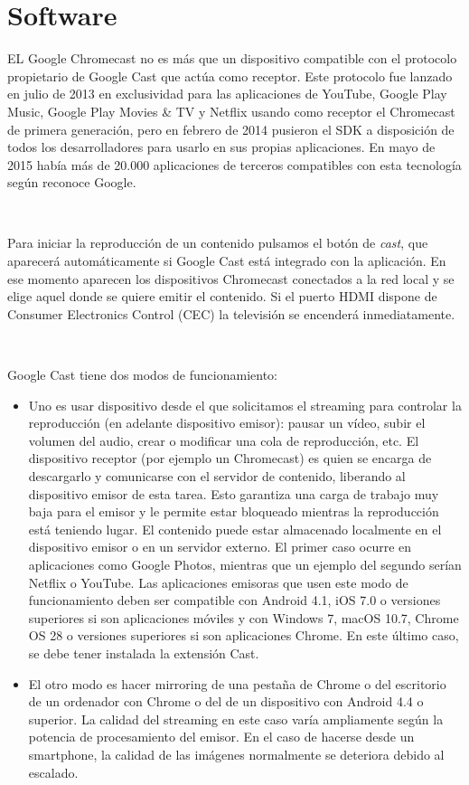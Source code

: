 \section{Software}

EL Google Chromecast no es más que un dispositivo compatible con el protocolo propietario de Google Cast que actúa como receptor.
Este protocolo fue lanzado en julio de 2013 en exclusividad para las aplicaciones de YouTube, Google Play Music, Google Play Movies \& TV y Netflix usando como receptor el Chromecast de primera generación, pero en febrero de 2014 pusieron el SDK a disposición de todos los desarrolladores para usarlo en sus propias aplicaciones.
En mayo de 2015 había más de 20.000 aplicaciones de terceros compatibles con esta tecnología según reconoce Google.

\

Para iniciar la reproducción de un contenido pulsamos el botón de \textit{cast}, que aparecerá automáticamente si Google Cast está integrado con la aplicación.
En ese momento aparecen los dispositivos Chromecast conectados a la red local y se elige aquel donde se quiere emitir el contenido.
Si el puerto HDMI dispone de Consumer Electronics Control (CEC) la televisión se encenderá inmediatamente.

\

Google Cast tiene dos modos de funcionamiento:

\begin{itemize}

	\item Uno es usar dispositivo desde el que solicitamos el streaming para controlar la reproducción (en adelante dispositivo emisor): pausar un vídeo, subir el volumen del audio, crear o modificar una cola de reproducción, etc.
	El dispositivo receptor (por ejemplo un Chromecast) es quien se encarga de descargarlo y comunicarse con el servidor de contenido, liberando al dispositivo emisor de esta tarea.
	Esto garantiza una carga de trabajo muy baja para el emisor y le permite estar bloqueado mientras la reproducción está teniendo lugar.
	El contenido puede estar almacenado localmente en el dispositivo emisor o en un servidor externo.
	El primer caso ocurre en aplicaciones como Google Photos, mientras que un ejemplo del segundo serían Netflix o YouTube.
	Las aplicaciones emisoras que usen este modo de funcionamiento deben ser compatible con Android 4.1, iOS 7.0 o versiones superiores si son aplicaciones móviles y con Windows 7, macOS 10.7, Chrome OS 28 o versiones superiores si son aplicaciones Chrome.
	En este último caso, se debe tener instalada la extensión Cast.

	\item El otro modo es hacer mirroring de una pestaña de Chrome o del escritorio de un ordenador con Chrome o del de un dispositivo con Android 4.4 o superior.
	La calidad del streaming en este caso varía ampliamente según la potencia de procesamiento del emisor.
	En el caso de hacerse desde un smartphone, la calidad de las imágenes normalmente se deteriora debido al escalado.

\end{itemize}

